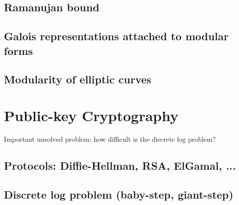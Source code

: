 \documentclass{book}
\theoremstyle{plain}
\theoremstyle{definition}
\numberwithin{equation}{section}
\numberwithin{figure}{section}
\numberwithin{table}{section}
\begin{document}
\section{Ramanujan bound}
\section{Galois representations attached to modular forms}
\section{Modularity of elliptic curves}




\chapter{Public-key Cryptography}

Important unsolved problem: how difficult is the discrete log problem?

\section{Protocols: Diffie-Hellman, RSA, ElGamal, ...}
\section{Discrete log problem (baby-step, giant-step)}




\end{document}
